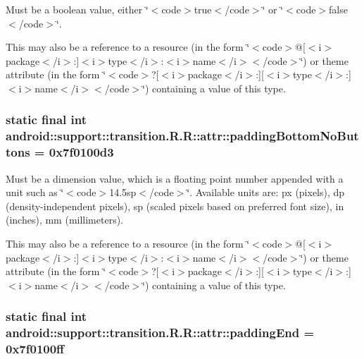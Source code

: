 Must be a boolean value, either \char`\"{}$<$code$>$true$<$/code$>$\char`\"{} or \char`\"{}$<$code$>$false$<$/code$>$\char`\"{}. 

This may also be a reference to a resource (in the form \char`\"{}$<$code$>$@\mbox{[}$<$i$>$package$<$/i$>$:\mbox{]}$<$i$>$type$<$/i$>$:$<$i$>$name$<$/i$>$$<$/code$>$\char`\"{}) or theme attribute (in the form \char`\"{}$<$code$>$?\mbox{[}$<$i$>$package$<$/i$>$:\mbox{]}\mbox{[}$<$i$>$type$<$/i$>$:\mbox{]}$<$i$>$name$<$/i$>$$<$/code$>$\char`\"{}) containing a value of this type. \hypertarget{classandroid_1_1support_1_1transition_1_1_r_1_1attr_724c679240925dace15aff291a88074a}{
\subsubsection[{paddingBottomNoButtons}]{\setlength{\rightskip}{0pt plus 5cm}static final int android::support::transition.R.R::attr::paddingBottomNoButtons = 0x7f0100d3}}
\label{classandroid_1_1support_1_1transition_1_1_r_1_1attr_724c679240925dace15aff291a88074a}


Must be a dimension value, which is a floating point number appended with a unit such as \char`\"{}$<$code$>$14.5sp$<$/code$>$\char`\"{}. Available units are: px (pixels), dp (density-independent pixels), sp (scaled pixels based on preferred font size), in (inches), mm (millimeters). 

This may also be a reference to a resource (in the form \char`\"{}$<$code$>$@\mbox{[}$<$i$>$package$<$/i$>$:\mbox{]}$<$i$>$type$<$/i$>$:$<$i$>$name$<$/i$>$$<$/code$>$\char`\"{}) or theme attribute (in the form \char`\"{}$<$code$>$?\mbox{[}$<$i$>$package$<$/i$>$:\mbox{]}\mbox{[}$<$i$>$type$<$/i$>$:\mbox{]}$<$i$>$name$<$/i$>$$<$/code$>$\char`\"{}) containing a value of this type. \hypertarget{classandroid_1_1support_1_1transition_1_1_r_1_1attr_4d9f4e1e4448cf2d59a333901d16c677}{
\subsubsection[{paddingEnd}]{\setlength{\rightskip}{0pt plus 5cm}static final int android::support::transition.R.R::attr::paddingEnd = 0x7f0100ff}}
\label{classandroid_1_1support_1_1transition_1_1_r_1_1attr_4d9f4e1e4448cf2d59a333901d16c677}


